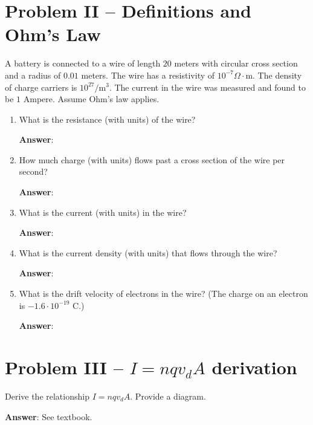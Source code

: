 \documentclass{article}
\begin{document}
\newpage

\section{Problem II -- Definitions and Ohm's Law}

A battery is connected to a wire of length $20$ meters with circular cross section and a radius of $0.01$ meters. The wire has a resistivity of $10^{-7}\Omega\cdot\text{m}$. The density of charge carriers is $10^{27}/\text{m}^3$. The current in the wire was measured and found to be $1$ Ampere. Assume Ohm's law applies.

\begin{enumerate}

  \item What is the resistance (with units) of the wire?

        \ifsolutions
        \textbf{Answer}:
        \else
        \vskip 84pt
        \fi

  \item How much charge (with units) flows past a cross section of the wire per second?

        \ifsolutions
        \textbf{Answer}:
        \else
        \vskip 84pt
        \fi

  \item What is the current (with units) in the wire?

        \ifsolutions
        \textbf{Answer}:
        \else
        \vskip 84pt
        \fi

  \item What is the current density (with units) that flows through the wire?

        \ifsolutions
        \textbf{Answer}:
        \else
        \vskip 84pt
        \fi

  \item What is the drift velocity of electrons in the wire? (The charge on an electron is $-1.6·10^{-19}\text{ C}$.)

        \ifsolutions
        \textbf{Answer}:
        \else
        \vskip 84pt
        \fi

\end{enumerate}

\newpage

\section{Problem III -- $I = nqv_dA$ derivation}

Derive the relationship $I = nqv_dA$. Provide a diagram.

\ifsolutions
\textbf{Answer}: See textbook.
\else

\fi
\end{document}
